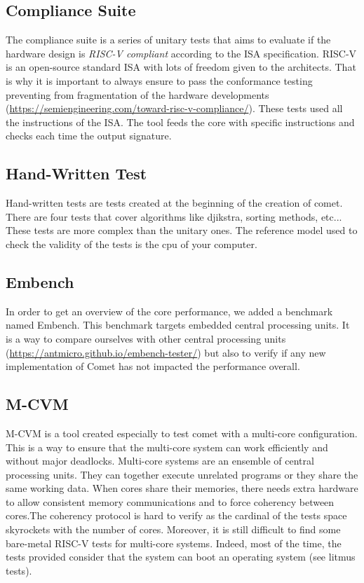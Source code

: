 \documentclass[10pt,letterpaper]{article}
\begin{document}
\subsection{Compliance Suite}

The compliance suite is a series of unitary tests that aims to evaluate if the hardware design is \textit{RISC-V compliant} according to the ISA specification. RISC-V is an open-source standard ISA with lots of freedom given to the architects. That is why it is important to always ensure to pass the conformance testing preventing from fragmentation of the hardware developments (\url{https://semiengineering.com/toward-risc-v-compliance/}). These tests used all the instructions of the ISA. The tool feeds the core with specific instructions and checks each time the output signature.

\subsection{Hand-Written Test}

Hand-written tests are tests created at the beginning of the creation of comet. There are four tests that cover algorithms like djikstra, sorting methods, etc... These tests are more complex than the unitary ones. The reference model used to check the validity of the tests is the cpu of your computer.

\subsection{Embench}

In order to get an overview of the core performance, we added a benchmark named Embench. This benchmark targets embedded central processing units. It is a way to compare ourselves with other central processing units (\url{https://antmicro.github.io/embench-tester/}) but also to verify if any new implementation of Comet has not impacted the performance overall.

\subsection{M-CVM}

M-CVM is a tool created especially to test comet with a multi-core configuration. This is a way to ensure that the multi-core system can work efficiently and without major deadlocks. Multi-core systems are an ensemble of central processing units. They can together execute unrelated programs or they share the same working data.  When cores share their memories, there needs extra hardware to allow consistent memory communications and to force coherency between cores.The coherency protocol is hard to verify as the cardinal of the tests space skyrockets with the number of cores. Moreover, it is still difficult to find some bare-metal RISC-V tests for multi-core systems. Indeed, most of the time, the tests provided consider that the system can boot an operating system (see litmus tests).
\end{document}
